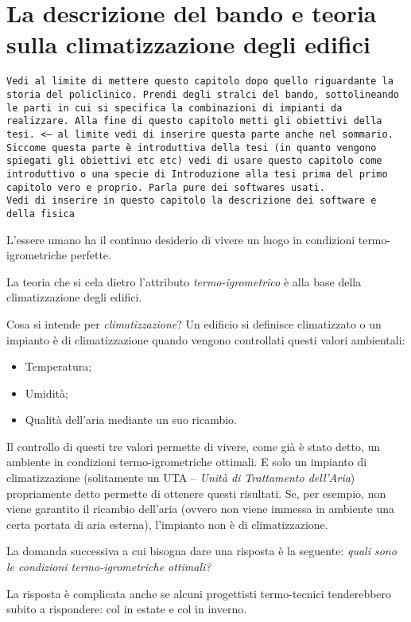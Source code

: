 \chapter{La descrizione del bando e teoria sulla climatizzazione degli edifici}
\thispagestyle{empty}
\texttt{Vedi al limite di mettere questo capitolo dopo quello riguardante la storia del policlinico.
	Prendi degli stralci del bando, sottolineando le parti in cui si specifica la combinazioni di impianti da realizzare. 
	Alla fine di questo capitolo metti gli obiettivi della tesi. <-- al limite vedi di inserire questa parte anche nel sommario. Siccome questa parte è introduttiva della tesi (in quanto vengono spiegati gli obiettivi etc etc) vedi di usare questo capitolo come introduttivo o una specie di Introduzione alla tesi prima del primo capitolo vero e proprio.
	Parla pure dei softwares usati.\\ Vedi di inserire in questo capitolo la descrizione dei software e della fisica}\\
\vspace{2cm}

L'essere umano ha il continuo desiderio di vivere un luogo in condizioni termo-igrometriche perfette. 

La teoria che si cela dietro l'attributo \emph{termo-igrometrico} è alla base della climatizzazione degli edifici.

Cosa si intende per \emph{climatizzazione}? Un edificio si definisce climatizzato o un impianto è di climatizzazione quando vengono controllati questi valori ambientali:
\begin{itemize}
	\item Temperatura;
	\item Umidità;
	\item Qualità dell'aria mediante un suo ricambio.
\end{itemize}
Il controllo di questi tre valori permette di vivere, come già è stato detto, un ambiente in condizioni termo-igrometriche ottimali. E solo un impianto di climatizzazione (solitamente un UTA -- \emph{Unità di Trattamento dell'Aria}) propriamente detto permette di ottenere questi risultati. Se, per esempio, non viene garantito il ricambio dell'aria (ovvero non viene immessa in ambiente una certa portata di aria esterna), l'impianto non è di climatizzazione.

La domanda successiva a cui bisogna dare una risposta è la seguente: \emph{quali sono le condizioni termo-igrometriche ottimali?}

La risposta è complicata anche se alcuni progettisti termo-tecnici tenderebbero subito a rispondere:  col  in estate e  col  in inverno.

